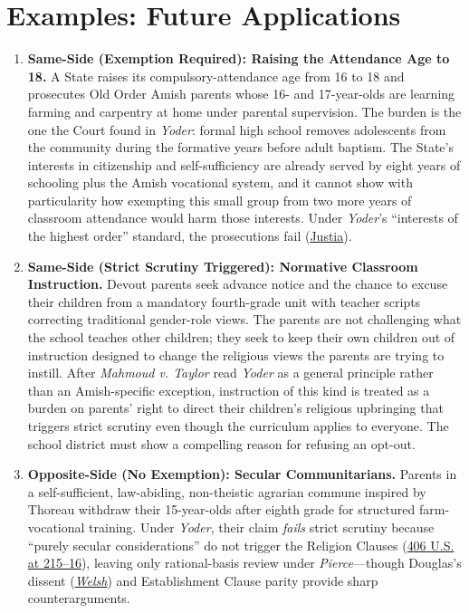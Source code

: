 \documentclass[12pt]{article}
\begin{document}
\section{Examples: Future Applications}
\begin{enumerate}

\item \textbf{Same-Side (Exemption Required): Raising the Attendance Age to 18.} A State raises its compulsory-attendance age from 16 to 18 and prosecutes Old Order Amish parents whose 16- and 17-year-olds are learning farming and carpentry at home under parental supervision. The burden is the one the Court found in \textit{Yoder}: formal high school removes adolescents from the community during the formative years before adult baptism. The State's interests in citizenship and self-sufficiency are already served by eight years of schooling plus the Amish vocational system, and it cannot show with particularity how exempting this small group from two more years of classroom attendance would harm those interests. Under \textit{Yoder}'s ``interests of the highest order'' standard, the prosecutions fail (\href{https://supreme.justia.com/cases/federal/us/406/205/}{Justia}).

\item \textbf{Same-Side (Strict Scrutiny Triggered): Normative Classroom Instruction.} Devout parents seek advance notice and the chance to excuse their children from a mandatory fourth-grade unit with teacher scripts correcting traditional gender-role views. The parents are not challenging what the school teaches other children; they seek to keep their own children out of instruction designed to change the religious views the parents are trying to instill. After \textit{Mahmoud v. Taylor} read \textit{Yoder} as a general principle rather than an Amish-specific exception, instruction of this kind is treated as a burden on parents' right to direct their children's religious upbringing that triggers strict scrutiny even though the curriculum applies to everyone. The school district must show a compelling reason for refusing an opt-out.

\item \textbf{Opposite-Side (No Exemption): Secular Communitarians.} Parents in a self-sufficient, law-abiding, non-theistic agrarian commune inspired by Thoreau withdraw their 15-year-olds after eighth grade for structured farm-vocational training. Under \emph{Yoder}, their claim \emph{fails} strict scrutiny because ``purely secular considerations'' do not trigger the Religion Clauses (\href{https://supreme.justia.com/cases/federal/us/406/205/}{406 U.S. at 215--16}), leaving only rational-basis review under \emph{Pierce}---though Douglas's dissent (\href{https://supreme.justia.com/cases/federal/us/398/333/}{\emph{Welsh}}) and Establishment Clause parity provide sharp counterarguments.


\end{enumerate}
\end{document}
